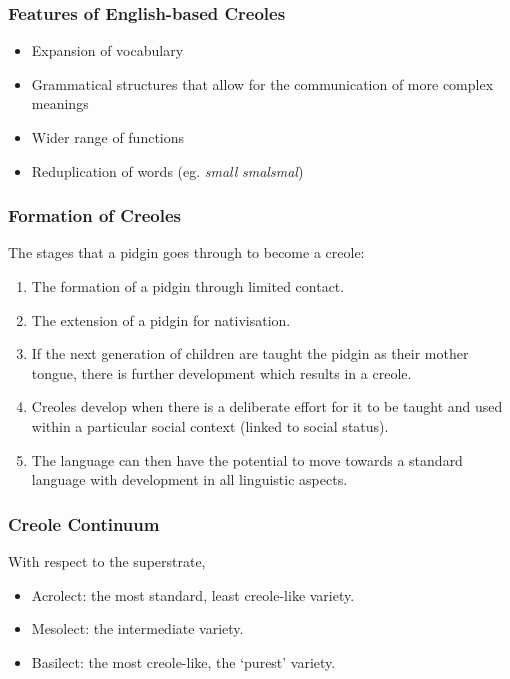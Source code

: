 \documentclass[../main.tex]{subfiles}
\begin{document}
        \subsubsection{Features of English-based Creoles}
        \begin{itemize}
            \item Expansion of vocabulary
            \item Grammatical structures that allow for the communication of more complex meanings
            \item Wider range of functions
            \item Reduplication of words (eg. \textit{small} \textrightarrow{} \textit{smalsmal})
        \end{itemize}

        \subsubsection{Formation of Creoles}
        The stages that a pidgin goes through to become a creole:
        \begin{enumerate}
            \item The formation of a pidgin through limited contact.
            \item The extension of a pidgin for nativisation.
            \item If the next generation of children are taught the pidgin as their mother tongue, there is further development which results in a creole.
            \item Creoles develop when there is a deliberate effort for it to be taught and used within a particular social context (linked to social status).
            \item The language can then have the potential to move towards a standard language with development in all linguistic aspects.
        \end{enumerate}
        
        \subsubsection{Creole Continuum}
        With respect to the superstrate,
        \begin{itemize}
            \item Acrolect: the most standard, least creole-like variety.
            \item Mesolect: the intermediate variety.
            \item Basilect: the most creole-like, the `purest' variety.
        \end{itemize}
\end{document}
